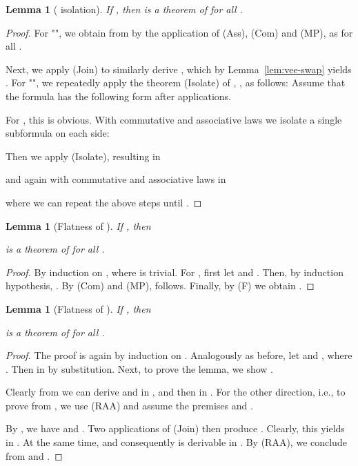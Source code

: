 \documentclass[a4paper,english,fleqn,11pt,final]{scrartcl}
\makeatletter
\newcommand{\ie}{i.e.\@\xspace}
\newcommand{\Deriv}[1]{{\normalfont\textsf{#1}}}
\theoremstyle{plain}
\newtheorem{lemma}[theorem]{Lemma}
\theoremstyle{definition}
\makeatother
\begin{document}
\begin{lemma}[ isolation]\label{lem:isolate-alpha}
If , then
 is a theorem of  for all .
\end{lemma}
\begin{proof}
For "", we obtain  from  by the application of \Deriv{(Ass)}, \Deriv{(Com)} and \Deriv{(MP)}, as  for all .

Next, we apply \Deriv{(Join)} to similarly derive , which by Lemma~\ref{lem:vee-swap} yields .
For "", we repeatedly apply the theorem \Deriv{(Isolate)} of , , as follows:
Assume that the formula has the following form after  applications.

For , this is obvious. With commutative and associative laws we isolate a single subformula on each side:

Then we apply \Deriv{(Isolate)}, resulting in

and again with commutative and associative laws in

where we can repeat the above steps until .
\end{proof}


\begin{lemma}[Flatness of ]\label{lem:flatness-transform}
If , then

is a theorem of  for all .
\end{lemma}
\begin{proof}
By induction on , where  is trivial.
For , first let  and .
Then, by induction hypothesis, .
By \Deriv{(Com)} and \Deriv{(MP)},  follows.
Finally, by \Deriv{(F)} we obtain .
\end{proof}

\begin{lemma}[Flatness of ]\label{lem:flatness-transform2}
If , then

is a theorem of  for all .
\end{lemma}
\begin{proof}
The proof is again by induction on .
Analogously as before, let  and , where .
Then  in  by substitution.
Next, to prove the lemma, we show .

Clearly from  we can derive  and  in , and then  in .
For the other direction, \ie, to prove  from , we use \Deriv{(RAA)} and assume the premises  and .

By , we have  and .
Two applications of \Deriv{(Join)} then produce .
Clearly, this yields  in .
At the same time,  and consequently  is derivable in .
By \Deriv{(RAA)}, we conclude  from  and .
\end{proof}
\end{document}
